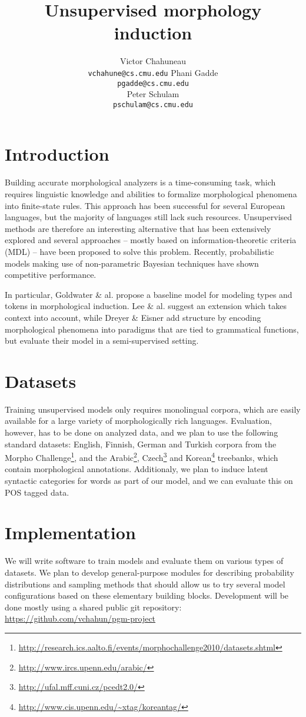 \documentclass{article}
\title{Unsupervised morphology induction}
\author{
Victor Chahuneau\\
\texttt{vchahune@cs.cmu.edu}
\And
Phani Gadde\\
\texttt{pgadde@cs.cmu.edu} \\
\And
Peter Schulam\\
\texttt{pschulam@cs.cmu.edu}
}
\begin{document}
\maketitle

\section{Introduction}
Building accurate morphological analyzers is a time-consuming task, which requires linguistic knowledge and abilities to formalize morphological phenomena into finite-state rules. This approach has been successful for several European languages, but the majority of languages still lack such resources. Unsupervised methods are therefore an interesting alternative that has been extensively explored  and several approaches -- mostly based on information-theoretic criteria (MDL) -- have been proposed to solve this problem. Recently, probabilistic models making use of non-parametric Bayesian techniques have shown competitive performance.

In particular, Goldwater \& al. \cite{goldwater2011} propose a baseline model for modeling types and tokens in morphological induction. Lee \& al. \cite{lee2011} suggest an extension which takes context into account, while Dreyer \& Eisner \cite{dreyer2011} add structure by encoding morphological phenomena into paradigms that are tied to grammatical functions, but evaluate their model in a semi-supervised setting.

\section{Datasets}
Training unsupervised models only requires monolingual corpora, which are easily available for a large variety of morphologically rich languages. Evaluation, however, has to be done on analyzed data, and we plan to use the following standard datasets: English, Finnish, German and Turkish corpora from the Morpho Challenge\footnote{\url{http://research.ics.aalto.fi/events/morphochallenge2010/datasets.shtml}}, and the Arabic\footnote{\url{http://www.ircs.upenn.edu/arabic/}}, Czech\footnote{\url{http://ufal.mff.cuni.cz/pcedt2.0/}} and Korean\footnote{\url{http://www.cis.upenn.edu/~xtag/koreantag/}} treebanks, which contain morphological annotations. Additionaly, we plan to induce latent syntactic categories for words as part of our model, and we can evaluate this on POS tagged data.

\section{Implementation}
We will write software to train models and evaluate them on various types of datasets. We plan to develop general-purpose modules for describing probability distributions and sampling methods that should allow us to try several model configurations based on these elementary building blocks. Development will be done mostly using a shared public git repository: \url{https://github.com/vchahun/pgm-project}
\end{document}

